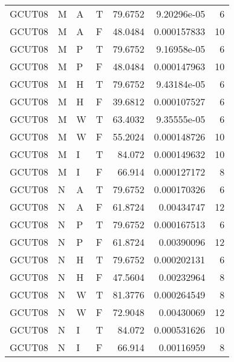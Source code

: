 \begin{tabular}{llllrrr}
    GCUT08   & M     & A     & T          & 79.6752    & 9.20296e-05 & 6        \\
    GCUT08   & M     & A     & F          & 48.0484    & 0.000157833 & 10       \\
    GCUT08   & M     & P     & T          & 79.6752    & 9.16958e-05 & 6        \\
    GCUT08   & M     & P     & F          & 48.0484    & 0.000147963 & 10       \\
    GCUT08   & M     & H     & T          & 79.6752    & 9.43184e-05 & 6        \\
    GCUT08   & M     & H     & F          & 39.6812    & 0.000107527 & 6        \\
    GCUT08   & M     & W     & T          & 63.4032    & 9.35555e-05 & 6        \\
    GCUT08   & M     & W     & F          & 55.2024    & 0.000148726 & 10       \\
    GCUT08   & M     & I     & T          & 84.072     & 0.000149632 & 10       \\
    GCUT08   & M     & I     & F          & 66.914     & 0.000127172 & 8        \\
    GCUT08   & N     & A     & T          & 79.6752    & 0.000170326 & 6        \\
    GCUT08   & N     & A     & F          & 61.8724    & 0.00434747  & 12       \\
    GCUT08   & N     & P     & T          & 79.6752    & 0.000167513 & 6        \\
    GCUT08   & N     & P     & F          & 61.8724    & 0.00390096  & 12       \\
    GCUT08   & N     & H     & T          & 79.6752    & 0.000202131 & 6        \\
    GCUT08   & N     & H     & F          & 47.5604    & 0.00232964  & 8        \\
    GCUT08   & N     & W     & T          & 81.3776    & 0.000264549 & 8        \\
    GCUT08   & N     & W     & F          & 72.9048    & 0.00430069  & 12       \\
    GCUT08   & N     & I     & T          & 84.072     & 0.000531626 & 10       \\
    GCUT08   & N     & I     & F          & 66.914     & 0.00116959  & 8        \\
    \hline
\end{tabular}